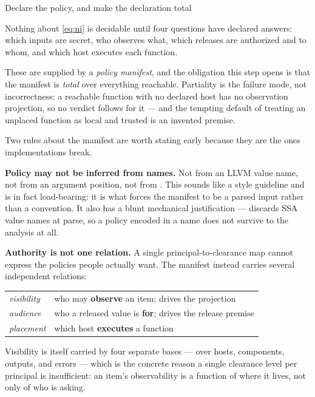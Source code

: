 \begin{step}{Declare the policy, and make the declaration total}{%
}
\label{step:manifest}

Nothing about \eqref{eq:ni} is decidable until four questions have declared
answers: which inputs are secret, who observes what, which releases are
authorized and to whom, and which host executes each function.

These are supplied by a \emph{policy manifest}, and the obligation this step
opens is that the manifest is \emph{total} over everything reachable. Partiality
is the failure mode, not incorrectness: a reachable function with no declared
host has no observation projection, so no verdict follows for it --- and the
tempting default of treating an unplaced function as local and trusted is an
invented premise.

Two rules about the manifest are worth stating early because they are the ones
implementations break.

\textbf{Policy may not be inferred from names.} Not from an LLVM value name, not
from an argument position, not from . This sounds like a style
guideline and is in fact load-bearing: it is what forces the manifest to be a
parsed input rather than a convention. It also has a blunt mechanical
justification ---  discards SSA value names at parse, so a policy
encoded in a name does not survive to the analysis at all.

\textbf{Authority is not one relation.} A single principal-to-clearance map
cannot express the policies people actually want. The manifest instead carries
several independent relations:

\begin{center}
\begin{tabular}{@{}ll@{}}
\toprule
\emph{visibility} & who may \textbf{observe} an item; drives the projection \\
\emph{audience} & who a released value is \textbf{for}; drives the release premise \\
\emph{placement} & which host \textbf{executes} a function \\
\bottomrule
\end{tabular}
\end{center}

Visibility is itself carried by four separate bases --- over hosts, components,
outputs, and errors --- which is the concrete reason a single clearance level per
principal is insufficient: an item's observability is a function of where it
lives, not only of who is asking.


\end{step}
